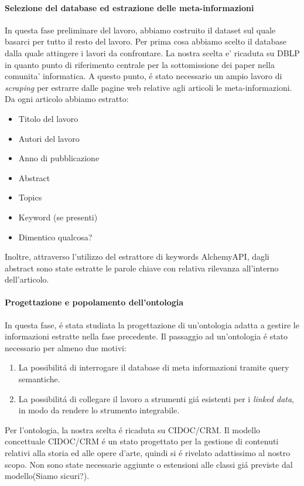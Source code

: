 \documentclass[11pt,twoside,a4paper]{article}
\begin{document}
\paragraph{Selezione del database ed estrazione delle meta-informazioni}
\label{par:infoextraction}
In questa fase preliminare del lavoro, abbiamo costruito il dataset sul quale basarci per tutto il resto del lavoro. Per prima cosa abbiamo scelto il database dalla quale attingere i lavori da confrontare. La nostra scelta e' ricaduta su DBLP\cite{DBLP} in quanto punto di riferimento centrale per la sottomissione dei paper nella comunita' informatica. 
A questo punto, \'e stato necessario un ampio lavoro di \emph{scraping} per estrarre dalle pagine web relative agli articoli le meta-informazioni. Da ogni articolo abbiamo estratto: 
\begin{itemize}
	\item Titolo del lavoro
	\item Autori del lavoro
	\item Anno di pubblicazione
	\item Abstract
	\item Topics
	\item Keyword (se presenti)
	\item Dimentico qualcosa?
\end{itemize} 
Inoltre, attraverso l'utilizzo del estrattore di keywords AlchemyAPI, dagli abstract sono state estratte le parole chiave con relativa rilevanza all'interno dell'articolo.

\paragraph{Progettazione e popolamento dell'ontologia}
\label{par:ontology}
In questa fase, \'e stata studiata la progettazione di un'ontologia adatta a gestire le informazioni estratte nella fase precedente. Il passaggio ad un'ontologia \'e stato necessario per almeno due motivi:
\begin{enumerate}
	\item La possibilit\'a di interrogare il database di meta informazioni tramite query semantiche.
	\item La possibilit\'a di collegare il lavoro a strumenti gi\'a esistenti per i \emph{linked data}, in modo da rendere lo strumento integrabile.
\end{enumerate}
Per l'ontologia, la nostra scelta \'e ricaduta su CIDOC/CRM\cite{CIDOC}. Il modello concettuale CIDOC/CRM \'e un stato progettato per la gestione di contenuti relativi alla storia ed alle opere d'arte, quindi si \'e rivelato adattissimo al nostro scopo. Non sono state necessarie aggiunte o estensioni alle classi gi\'a previste dal modello(Siamo sicuri?).
\end{document}
